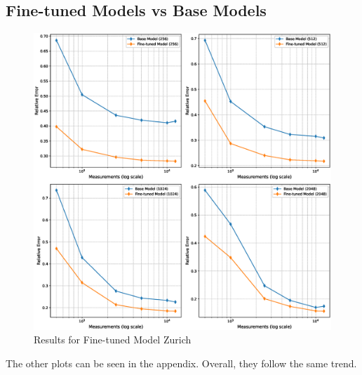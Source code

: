 \subsection{Fine-tuned Models vs Base Models}
\begin{figure}[h!]
    \centering
    \includegraphics[width=\textwidth]{figures/06_results/fine_tuned_zuerich.eps}
    \caption{Results for Fine-tuned Model Zurich}
\end{figure}
The other plots can be seen in the appendix.
Overall, they follow the same trend.

